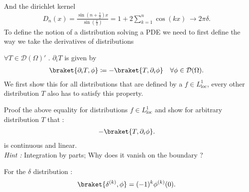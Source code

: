 \begin{figure}[h]
  \begin{center}
  \end{center}
\end{figure}
\hspace{0mm}\\
And the dirichlet kernel 
\begin{align*}
  D_n(x) = \frac{\sin(n+\frac{1}{2})x}{\sin(\frac{x}{2})} = 1+ 2\sum_{k=1}^{n}  \cos(kx)  \ \to 2\pi \delta 
.\end{align*} 
To define the notion of a distribution solving a PDE we need to first define the way we take the derivatives of distributions
\begin{definition}
  $\forall  T \in  \mathcal{D}(\Omega )'$ . $\partial_i T$ is given by  
  \begin{align*}
    \braket{\partial_i T, \phi } \coloneqq  - \braket{T,\partial_i \phi } \quad \forall  \phi  \in \mathcal{D}(\Omega )
  .\end{align*}
  We first show this for all distributions that are defined by a $f \in L_{\text{loc}}^{1} $, every other distribution $T$ also has to satisfy this property.
\end{definition}
\begin{exercise}
  Proof the above equality for distributions $f \in  L_{\text{loc}}^{1} $ and show for arbitrary distribution $T$ that :
  \begin{align*}
    -\braket{T,\partial_i \phi }
  .\end{align*}
  is continuous and linear.\\[1ex]
  \textit{Hint : } Integration by parts; Why does it vanish on the boundary ?
\end{exercise}
\begin{example}
 For the $\delta $  distribution : 
 \begin{align*}
   \braket{\delta ^{(k)},\phi  } = (-1)^{k} \phi ^{(k)}(0)
 .\end{align*}
\end{example}

